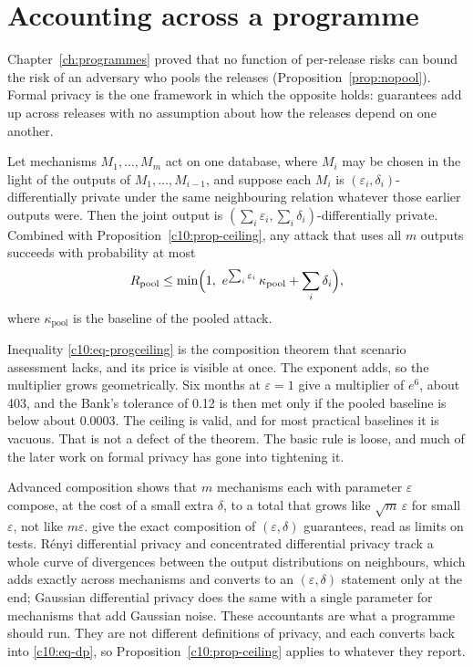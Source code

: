 \section{Accounting across a programme}

Chapter~\ref{ch:programmes} proved that no function of per-release risks can bound
the risk of an adversary who pools the releases (Proposition~\ref{prop:nopool}).
Formal privacy is the one framework in which the opposite holds: guarantees add up
across releases with no assumption about how the releases depend on one another.

\begin{proposition}\label{c10:prop-comp}
Let mechanisms $M_1,\dots,M_m$ act on one database, where $M_i$ may be
chosen in the light of the outputs of $M_1,\dots,M_{i-1}$, and suppose each $M_i$
is $(\varepsilon_i,\delta_i)$-differentially private under the same neighbouring
relation whatever those earlier outputs were. Then the joint output is
$(\sum_i \varepsilon_i, \sum_i \delta_i)$-differentially private. Combined with
Proposition~\ref{c10:prop-ceiling}, any attack that uses all $m$ outputs succeeds
with probability at most
\begin{equation}\label{c10:eq-progceiling}
R_{\mathrm{pool}} \le \min\Bigl(1,\ e^{\sum_i \varepsilon_i}\,\kappa_{\mathrm{pool}} + \sum_i \delta_i\Bigr),
\end{equation}
where $\kappa_{\mathrm{pool}}$ is the baseline of the pooled attack.
\end{proposition}

Inequality \eqref{c10:eq-progceiling} is the composition theorem that scenario
assessment lacks, and its price is visible at once. The exponent adds, so the
multiplier grows geometrically. Six months at $\varepsilon = 1$ give a multiplier
of $e^6$, about 403, and the Bank's tolerance of 0.12 is then met only if the
pooled baseline is below about 0.0003.
The ceiling is valid, and for most practical baselines it is vacuous. That is not
a defect of the theorem. The basic rule is loose, and much of the later work on
formal privacy has gone into tightening it.

Advanced composition \citep{dwork2010} shows that $m$ mechanisms each with
parameter $\varepsilon$ compose, at the cost of a small extra $\delta$, to a total
that grows like $\sqrt{m}\,\varepsilon$ for small $\varepsilon$, not like
$m\varepsilon$. \citet{kairouz2017} give the exact composition of
$(\varepsilon,\delta)$ guarantees, read as limits on tests. Rényi differential
privacy \citep{mironov2017} and concentrated differential privacy
\citep{bun2016} track a whole curve of divergences between the output
distributions on neighbours, which adds exactly across mechanisms and converts to
an $(\varepsilon,\delta)$ statement only at the end; Gaussian differential privacy
\citep{dong2022} does the same with a single parameter for mechanisms that add
Gaussian noise. These accountants are what a programme should run. They are not
different definitions of privacy, and each converts back into
\eqref{c10:eq-dp}, so Proposition~\ref{c10:prop-ceiling} applies to whatever they
report.

